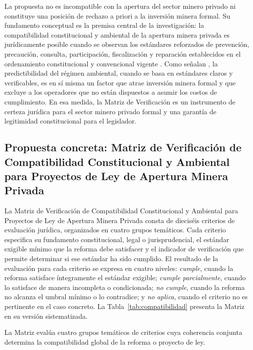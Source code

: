 La propuesta no es incompatible con la apertura del sector minero privado ni constituye una posición de rechazo a priori a la inversión minera formal. Su fundamento conceptual es la premisa central de la investigación: la compatibilidad constitucional y ambiental de la apertura minera privada es jurídicamente posible cuando se observan los estándares reforzados de prevención, precaución, consulta, participación, fiscalización y reparación establecidos en el ordenamiento constitucional y convencional vigente \parencite{cre_2008,coa_2017,acuerdo_escazu_2018}. Como señalan \textcite{peck_et_al_2024}, la predictibilidad del régimen ambiental, cuando se basa en estándares claros y verificables, es en sí misma un factor que atrae inversión minera formal y que excluye a los operadores que no están dispuestos a asumir los costos de cumplimiento. En esa medida, la Matriz de Verificación es un instrumento de certeza jurídica para el sector minero privado formal y una garantía de legitimidad constitucional para el legislador.

\subsection{Propuesta concreta: Matriz de Verificación de Compatibilidad Constitucional y Ambiental para Proyectos de Ley de Apertura Minera Privada}

La Matriz de Verificación de Compatibilidad Constitucional y Ambiental para Proyectos de Ley de Apertura Minera Privada consta de dieciséis criterios de evaluación jurídica, organizados en cuatro grupos temáticos. Cada criterio especifica su fundamento constitucional, legal o jurisprudencial, el estándar exigible mínimo que la reforma debe satisfacer y el indicador de verificación que permite determinar si ese estándar ha sido cumplido. El resultado de la evaluación para cada criterio se expresa en cuatro niveles: \textit{cumple}, cuando la reforma satisface íntegramente el estándar exigible; \textit{cumple parcialmente}, cuando lo satisface de manera incompleta o condicionada; \textit{no cumple}, cuando la reforma no alcanza el umbral mínimo o lo contradice; y \textit{no aplica}, cuando el criterio no es pertinente en el caso concreto. La Tabla~\ref{tab:compatibilidad} presenta la Matriz en su versión sistematizada.



La Matriz evalúa cuatro grupos temáticos de criterios cuya coherencia conjunta determina la compatibilidad global de la reforma o proyecto de ley.


